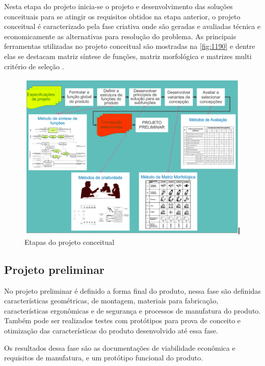 Nesta etapa do projeto inicia-se o projeto e desenvolvimento das soluções conceituais para se atingir os requisitos obtidos na etapa anterior, o projeto conceitual é
caracterizado pela fase criativa onde são geradas e avaliadas técnica e economicamente as alternativas para resolução do problema.
As principais ferramentas utilizadas no projeto conceitual são mostradas na \autoref{fig:1190} e dentre elas se destacam matriz síntese de funções, matriz morfológica
e matrizes multi critério de seleção \autocite{PRODIP}.

\begin{figure}[htb]
	\caption{\label{fig:1190}Etapas do projeto conceitual}
	\begin{center}
		\includegraphics[width=\textwidth]{pictures/1190.png}
	\end{center}
\end{figure}

\subsection{Projeto preliminar}

No projeto preliminar é definido a forma final do produto, nessa fase são definidas características geométricas, de montagem, materiais para fabricação, características
ergonômicas e de segurança e processos de manufatura do produto. Também pode ser realizados testes com protótipos para prova de conceito e otimização das características
do produto desenvolvido até essa fase. \autocite{Back2008}

Os resultados dessa fase são as documentações de viabilidade econômica e requisitos de manufatura, e um protótipo funcional do produto.

